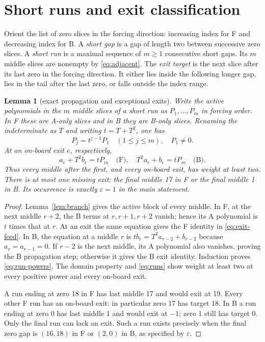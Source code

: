 \documentclass{article}
\newtheorem{lemma}{Lemma}
\begin{document}
\section{Short runs and exit classification}\label{sec:runs}

Orient the list of zero slices in the forcing direction: increasing index for F and decreasing
index for B. A \emph{short gap} is a gap of length two between successive zero slices. A
\emph{short run} is a maximal sequence of \(m \ge 1\) consecutive short gaps. Its \(m\) middle
slices are nonempty by \eqref{eq:adjacent}. The \emph{exit target} is the next slice after its
last zero in the forcing direction. It either lies inside the following longer gap, lies in the
tail after the last zero, or falls outside the index range.

\begin{lemma}[exact propagation and exceptional exits]\label{lem:propagation}
  Write the active polynomials in the \(m\) middle slices of a short run as
  \(P_1, \dots, P_m\) in forcing order. In F these are A-only slices and in B they are B-only
  slices. Renaming the indeterminate as \(T\) and writing \(t = T + T^2\), one has
  \begin{equation}\label{eq:run-powers}
    P_j = t^{j-1} P_1 \quad (1 \le j \le m), \quad P_1 \ne 0.
  \end{equation}
  At an on-board exit \(e\), respectively,
  \begin{equation}\label{eq:exit-feed}
    a_e + T^2 b_e = t P_m \quad \text{(F)}, \quad
    T^2 a_e + b_e = t P_m \quad \text{(B)}.
  \end{equation}
  Thus every middle after the first, and every on-board exit, has weight at least two. There is
  at most one missing exit: the final middle 17 in F or the final middle 1 in B. Its occurrence is
  exactly \(\varepsilon = 1\) in the main statement.
\end{lemma}

\begin{proof}
  Lemma~\ref{lem:branch} gives the active block of every middle. In F, at the next middle
  \(r + 2\), the B terms at \(r, r + 1, r + 2\) vanish; hence its A polynomial is \(t\) times that
  at \(r\). At an exit the same equation gives the F identity in \eqref{eq:exit-feed}. In B, the
  equation at a middle \(r\) is \(t b_r = T^2 a_{r-2} + b_{r-2}\) because \(a_r = a_{r-1} = 0\). If
  \(r - 2\) is the next middle, its A polynomial also vanishes, proving the B propagation step;
  otherwise it gives the B exit identity. Induction proves \eqref{eq:run-powers}. The domain
  property and \eqref{eq:runs} show weight at least two at every positive power and every on-board
  exit.

  A run ending at zero 18 in F has last middle 17 and would exit at 19. Every other F run has an
  on-board exit: in particular zero 17 has target 18. In B a run ending at zero 0 has last middle 1
  and would exit at \(-1\); zero 1 still has target 0. Only the final run can lack an exit. Such a
  run exists precisely when the final zero gap is \((16,18)\) in F or \((2,0)\) in B, as specified
  by \(\varepsilon\).
\end{proof}
\end{document}
